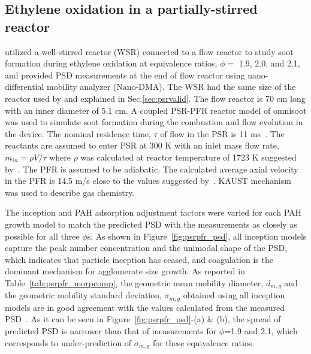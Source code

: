 \subsection{Ethylene oxidation in a partially-stirred reactor}

\citet{manzello2007soot} utilized a well-stirred reactor (WSR) connected to a flow reactor to study soot formation during ethylene oxidation at equivalence ratios, $\phi=$ 1.9, 2.0, and 2.1, and provided PSD measurements at the end of flow reactor using nano-differential mobility analyzer (Nano-DMA). The WSR had the same size of the reactor used by \citet{manzello2007soot} and explained in Sec.\ref{sec:psrvalid}. The flow reactor is 70 cm long with an inner diameter of 5.1 cm. A coupled PSR-PFR reactor model of omnisoot was used to simulate soot formation during the combustion and flow evolution in the device. The nominal residence time, $\tau$ of flow in the PSR is 11 ms~\citep{manzello2007soot}. The reactants are assumed to enter PSR at 300 K with an inlet mass flow rate, $\dot{m}_{in}=\rho V / \tau$ where $\rho$ was calculated at reactor temperature of 1723 K suggested by~\citet{lenhert2009effects}. The PFR is assumed to be adiabatic. The calculated average axial velocity in the PFR is 14.5 m/s close to the values suggested by~\citet{manzello2007soot}. KAUST mechanism was used to describe gas chemistry. 

The inception and PAH adsorption adjustment factors were varied for each PAH growth model to match the predicted PSD with the measurements as closely as possible for all three $\phi$s. As shown in Figure~\ref{fig:psrpfr_psd}, all inception models capture the peak number concentration and the unimodal shape of the PSD, which indicates that particle inception has ceased, and coagulation is the dominant mechanism for agglomerate size growth. As reported in Table~\ref{tab:psrpfr_morpcomp}, the geometric mean mobility diameter, $d_{m,g}$ and the geometric mobility standard deviation, $\sigma_{m,g}$ obtained using all inception models are in good agreement with the values calculated from the measured PSD~\citep{manzello2007soot}. As it can be seen in Figure~\ref{fig:psrpfr_psd}-(a) \& (b), the spread of predicted PSD is narrower than that of measurements for $\phi$=1.9 and 2.1, which corresponds to under-prediction of $\sigma_{m,g}$ for these equivalence ratios.



